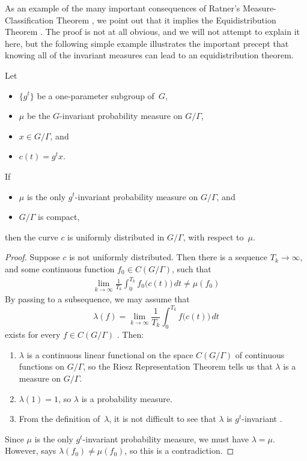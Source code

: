 As an example of the many important consequences of Ratner's Measure-Classification Theorem , we point out that it implies the Equidistribution Theorem . The proof is not at all obvious, and we will not attempt to explain it here, but the following simple example illustrates the important precept that knowing all of the invariant measures can lead to an equidistribution theorem.

\begin{prop} \label{UniqErg->UnifDist}
Let  
\noprelistbreak
	\begin{itemize}
	\item $\{g^t\}$ be a one-parameter subgroup of~$G$, 
	\item $\mu$ be the $G$-invariant probability measure on $G/\Gamma$,
	\item $x \in G/\Gamma$,
	and
	\item $c(t) = g^t x$.
	\end{itemize}
If 
	\begin{itemize}
	\item $\mu$ is the only $g^t$-invariant probability measure on $G/\Gamma$, 
	and
	\item $G/\Gamma$ is compact,
	\end{itemize}
then the curve $c$ is uniformly distributed in $G/\Gamma$, with respect to~$\mu$.
\end{prop}

\begin{proof}
Suppose $c$ is not uniformly distributed. Then there is a sequence $T_k \to \infty$, and some continuous function $f_0 \in C(G/\Gamma)$, such that
	\begin{align} \label{UniqErg->UnifDistPf-notmu}
	\lim_{k \to \infty} \frac{1}{T_k} \int_0^{T_k} f_0 \bigl( c(t) \bigr) \, dt \neq \mu(f_0) 
	\end{align}
By passing to a subsequence, we may assume that
	$$ \lambda(f) = \lim_{k \to \infty} \frac{1}{T_k} \int_0^{T_k} f \bigl( c(t) \bigr) \, dt $$
exists for every $f \in C(G/\Gamma)$ . Then:
	\begin{enumerate}
	\item $\lambda$ is a continuous linear functional on the space $C(G/\Gamma)$ of continuous functions on $G/\Gamma$, so the Riesz Representation Theorem  tells us that $\lambda$ is a measure on $G/\Gamma$. 
	\item $\lambda(1) = 1$, so $\lambda$ is a probability measure. 
	\item From the definition of~$\lambda$, it is not difficult to see that $\lambda$ is $g^t$-invariant . 
	\end{enumerate}
Since $\mu$ is the only $g^t$-invariant probability measure, we must have $\lambda = \mu$. However,  says $\lambda(f_0) \neq \mu(f_0)$, so this is a contradiction.
\end{proof}

